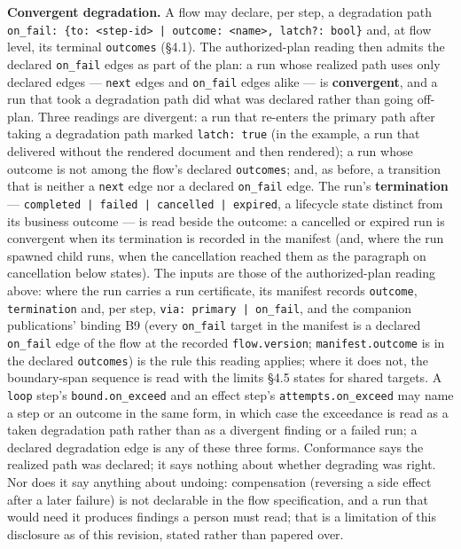 \documentclass[11pt]{article}
\newcommand{\code}[1]{\texttt{#1}}
\begin{document}
\textbf{Convergent degradation.} A flow may declare, per step, a degradation path \code{on\_fail: \{to: \textless{}step-id\textgreater{} | outcome: \textless{}name\textgreater{}, latch?: bool\}} and, at flow level, its terminal \code{outcomes} (\S4.1). The authorized-plan reading then admits the declared \code{on\_fail} edges as part of the plan: a run whose realized path uses only declared edges --- \code{next} edges and \code{on\_fail} edges alike --- is \textbf{convergent}, and a run that took a degradation path did what was declared rather than going off-plan. Three readings are divergent: a run that re-enters the primary path after taking a degradation path marked \code{latch: true} (in the example, a run that delivered without the rendered document and then rendered); a run whose outcome is not among the flow's declared \code{outcomes}; and, as before, a transition that is neither a \code{next} edge nor a declared \code{on\_fail} edge. The run's \textbf{termination} --- \code{completed | failed | cancelled | expired}, a lifecycle state distinct from its business outcome --- is read beside the outcome: a cancelled or expired run is convergent when its termination is recorded in the manifest (and, where the run spawned child runs, when the cancellation reached them as the paragraph on cancellation below states). The inputs are those of the authorized-plan reading above: where the run carries a run certificate, its manifest records \code{outcome}, \code{termination} and, per step, \code{via: primary | on\_fail}, and the companion publications' binding B9 (every \code{on\_fail} target in the manifest is a declared \code{on\_fail} edge of the flow at the recorded \code{flow.version}; \code{manifest.outcome} is in the declared \code{outcomes}) is the rule this reading applies; where it does not, the boundary-span sequence is read with the limits \S4.5 states for shared targets. A \code{loop} step's \code{bound.on\_exceed} and an effect step's \code{attempts.on\_exceed} may name a step or an outcome in the same form, in which case the exceedance is read as a taken degradation path rather than as a divergent finding or a failed run; a declared degradation edge is any of these three forms. Conformance says the realized path was declared; it says nothing about whether degrading was right. Nor does it say anything about undoing: compensation (reversing a side effect after a later failure) is not declarable in the flow specification, and a run that would need it produces findings a person must read; that is a limitation of this disclosure as of this revision, stated rather than papered over.
\end{document}
